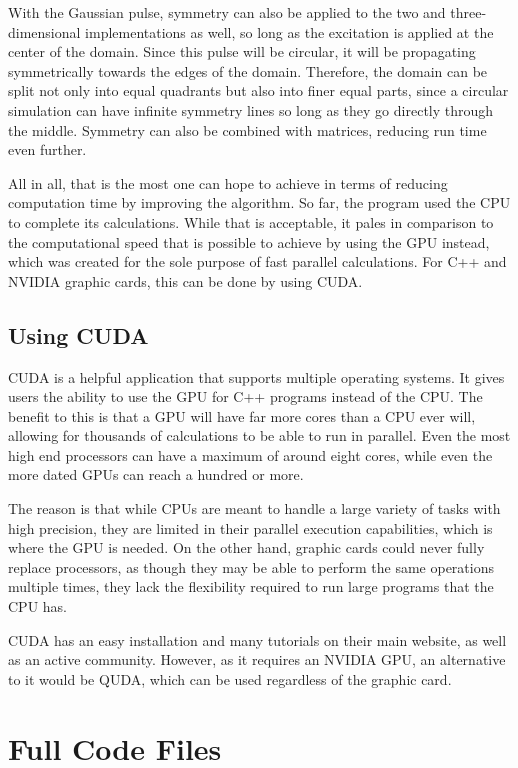 With the Gaussian pulse, symmetry can also be applied to the two and three-dimensional implementations as well, so long as the excitation is applied at the center of the domain. Since this pulse will be circular, it will be propagating symmetrically towards the edges of the domain. Therefore, the domain can be split not only into equal quadrants but also into finer equal parts, since a circular simulation can have infinite symmetry lines so long as they go directly through the middle. Symmetry can also be combined with matrices, reducing run time even further.

All in all, that is the most one can hope to achieve in terms of reducing computation time by improving the algorithm. So far, the program used the CPU to complete its calculations. While that is acceptable, it pales in comparison to the computational speed that is possible to achieve by using the GPU instead, which was created for the sole purpose of fast parallel calculations. For C++ and NVIDIA graphic cards, this can be done by using CUDA.
 
\subsection{Using CUDA}\label{sec:cuda}

CUDA is a helpful application that supports multiple operating systems. It gives users the ability to use the GPU for C++ programs instead of the CPU. The benefit to this is that a GPU will have far more cores than a CPU ever will, allowing for thousands of calculations to be able to run in parallel. Even the most high end processors can have a maximum of around eight cores, while even the more dated GPUs can reach a hundred or more. 

The reason is that while CPUs are meant to handle a large variety of tasks with high precision, they are limited in their parallel execution capabilities, which is where the GPU is needed. On the other hand, graphic cards could never fully replace processors, as though they may be able to perform the same operations multiple times, they lack the flexibility required to run large programs that the CPU has.

CUDA has an easy installation and many tutorials on their main website, as well as an active community. However, as it requires an NVIDIA GPU, an alternative to it would be QUDA\textsuperscript{\cite{quda}}, which can be used regardless of the graphic card.
\clearpage

\section{Full Code Files}

